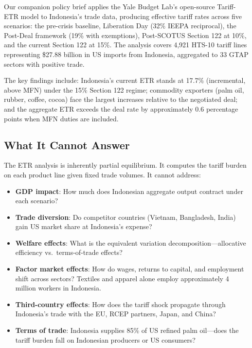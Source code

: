 \documentclass[12pt,a4paper]{article}
\begin{document}
Our companion policy brief \cite{wicaksono2026} applies the Yale Budget Lab's open-source Tariff-ETR model \cite{yalebudgetlab_model} to Indonesia's trade data, producing effective tariff rates across five scenarios: the pre-crisis baseline, Liberation Day (32\% IEEPA reciprocal), the Post-Deal framework (19\% with exemptions), Post-SCOTUS Section 122 at 10\%, and the current Section 122 at 15\%. The analysis covers 4,921 HTS-10 tariff lines representing \$27.88 billion in US imports from Indonesia, aggregated to 33 GTAP sectors with positive trade.

The key findings include: Indonesia's current ETR stands at 17.7\% (incremental, above MFN) under the 15\% Section 122 regime; commodity exporters (palm oil, rubber, coffee, cocoa) face the largest increases relative to the negotiated deal; and the aggregate ETR exceeds the deal rate by approximately 0.6 percentage points when MFN duties are included.

\subsection{What It Cannot Answer}

The ETR analysis is inherently partial equilibrium. It computes the tariff burden on each product line given fixed trade volumes. It cannot address:

\begin{itemize}
    \item \textbf{GDP impact}: How much does Indonesian aggregate output contract under each scenario?
    \item \textbf{Trade diversion}: Do competitor countries (Vietnam, Bangladesh, India) gain US market share at Indonesia's expense?
    \item \textbf{Welfare effects}: What is the equivalent variation decomposition---allocative efficiency vs.\ terms-of-trade effects?
    \item \textbf{Factor market effects}: How do wages, returns to capital, and employment shift across sectors? Textiles and apparel alone employ approximately 4 million workers in Indonesia.
    \item \textbf{Third-country effects}: How does the tariff shock propagate through Indonesia's trade with the EU, RCEP partners, Japan, and China?
    \item \textbf{Terms of trade}: Indonesia supplies 85\% of US refined palm oil---does the tariff burden fall on Indonesian producers or US consumers?
\end{itemize}
\end{document}
